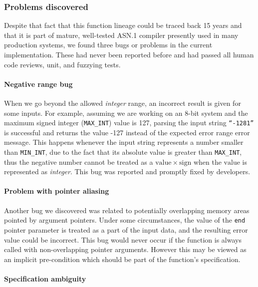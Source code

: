 \documentclass[10p,conference]{IEEEtran}
\begin{document}
\subsubsection{Problems discovered}

Despite that fact that this function lineage could be traced back 15
years and that it is part of mature, well-tested ASN.1 compiler presently used
in many production systems, we
found three bugs or problems in the current implementation. These had
never been reported before and had passed all human code reviews, unit, and
fuzzying tests.
  
\paragraph{Negative range bug}

When we go beyond the allowed \textit{integer} range, an incorrect result is given
for some inputs. For example, assuming we are working on an 8-bit
system and the maximum signed integer (\texttt{MAX\_INT}) value is 127, parsing the input
string \texttt{``-1281''} is successful and returns the value -127 instead of the expected error range error message. This happens whenever the input
string represents a number smaller than \texttt{MIN\_INT}, due to the
fact that its absolute value is greater than
\texttt{MAX\_INT}, thus the negative number cannot be treated as a
$\mathrm{value}\times\mathrm{sign}$ when the $\mathrm{value}$ is
represented as \textit{integer}. This bug was reported and promptly fixed by
developers.

\paragraph{Problem with pointer aliasing}

Another bug we discovered was related to potentially overlapping
memory areas pointed by argument pointers. Under some circumstances,
the value of the \texttt{end} pointer parameter is treated as a part
of the input data, and the resulting error value could be
incorrect. This bug would never occur if the function is always called
with non-overlapping pointer arguments. However this may be viewed
as an implicit pre-condition which should be part of the function's
specification.

\paragraph{Specification ambiguity}
\end{document}
